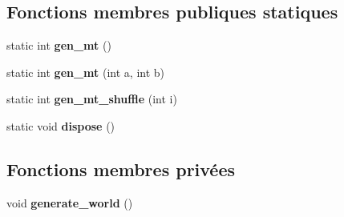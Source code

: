 \subsection*{Fonctions membres publiques statiques}
\begin{DoxyCompactItemize}
\item 
\hypertarget{classWorld_ae1a517e48a53300f77b9715f2d05da9f}{static int {\bfseries gen\-\_\-mt} ()}\label{classWorld_ae1a517e48a53300f77b9715f2d05da9f}

\item 
\hypertarget{classWorld_a5e407254abb3e35217524fe37f8a6a82}{static int {\bfseries gen\-\_\-mt} (int a, int b)}\label{classWorld_a5e407254abb3e35217524fe37f8a6a82}

\item 
\hypertarget{classWorld_aeeb9732117c1ed11efd98d17b1177e54}{static int {\bfseries gen\-\_\-mt\-\_\-shuffle} (int i)}\label{classWorld_aeeb9732117c1ed11efd98d17b1177e54}

\item 
\hypertarget{classWorld_abf19b18c7eb174377bf99b41aa84e769}{static void {\bfseries dispose} ()}\label{classWorld_abf19b18c7eb174377bf99b41aa84e769}

\end{DoxyCompactItemize}
\subsection*{Fonctions membres privées}
\begin{DoxyCompactItemize}
\item 
\hypertarget{classWorld_a97231d15fa0e1953eb69fec82e098794}{void {\bfseries generate\-\_\-world} ()}\label{classWorld_a97231d15fa0e1953eb69fec82e098794}

\end{DoxyCompactItemize}
